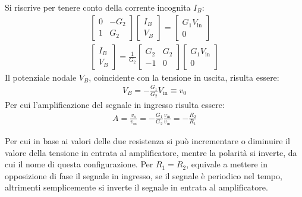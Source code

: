 \documentclass{article}
\numberwithin{equation}{subsection}
\begin{document}
Si riscrive per tenere conto della corrente incognita $I_B$:
\begin{gather*}
    \begin{bmatrix}
        0&-G_2\\1&G_2
    \end{bmatrix}\begin{bmatrix}
        I_B\\V_{B}
    \end{bmatrix}=\begin{bmatrix}
        G_1V_\mathrm{in}\\0
    \end{bmatrix}\\
    \begin{bmatrix}
        I_B\\V_B
    \end{bmatrix}=\displaystyle\frac{1}{G_2}\begin{bmatrix}
        G_2&G_2\\-1&0
    \end{bmatrix}\begin{bmatrix}
        G_1V_\mathrm{in}\\0
    \end{bmatrix}
\end{gather*}
Il potenziale nodale $V_B$, coincidente con la tensione in uscita, risulta essere:
\begin{gather*}
    V_B=-\displaystyle\frac{G_1}{G_2}V_\mathrm{in}\equiv v_0
\end{gather*}
Per cui l'amplificazione del segnale in ingresso risulta essere:
\begin{gather*}
    A=\displaystyle\frac{v_o}{v_\mathrm{in}}=-\frac{G_1}{G_2}\frac{v_\mathrm{in}}{v_\mathrm{in}}=-\frac{R_2}{R_1}
\end{gather*}

Per cui in base ai valori delle due resistenza si può incrementare o diminuire il valore della tensione in entrata al amplificatore, mentre 
la polarità si inverte, da cui il nome di questa configurazione. 
Per $R_1=R_2$, equivale a mettere in opposizione di fase il segnale in ingresso, se il segnale è periodico nel tempo, altrimenti semplicemente 
si inverte il segnale in entrata al amplificatore. 
\end{document}
